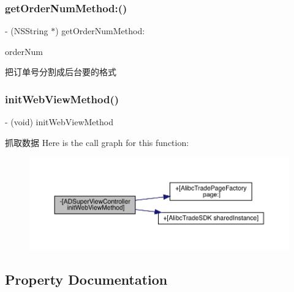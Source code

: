 \subsubsection{\texorpdfstring{get\+Order\+Num\+Method\+:()}{getOrderNumMethod:()}}
{\footnotesize\ttfamily -\/ (N\+S\+String $\ast$) get\+Order\+Num\+Method\+: \begin{DoxyParamCaption}\item[{(N\+S\+String $\ast$)}]{order\+Num }\end{DoxyParamCaption}}

把订单号分割成后台要的格式 \mbox{\label{interface_a_d_super_view_controller_a3c8ad0c74f7158670ff46e3b4e4f54cc}} 
\subsubsection{\texorpdfstring{init\+Web\+View\+Method()}{initWebViewMethod()}}
{\footnotesize\ttfamily -\/ (void) init\+Web\+View\+Method \begin{DoxyParamCaption}{ }\end{DoxyParamCaption}}

抓取数据 Here is the call graph for this function\+:\nopagebreak
\begin{figure}[H]
\begin{center}
\leavevmode
\includegraphics[width=350pt]{interface_a_d_super_view_controller_a3c8ad0c74f7158670ff46e3b4e4f54cc_cgraph}
\end{center}
\end{figure}


\subsection{Property Documentation}
\mbox{\label{interface_a_d_super_view_controller_ab8010fdd29cdca9d38c2677be2496679}} 
